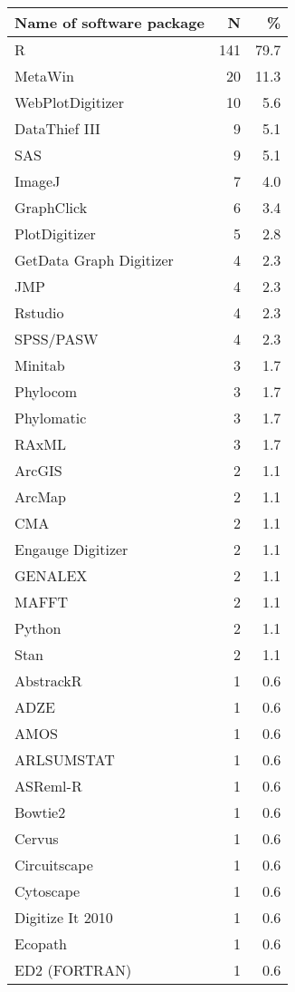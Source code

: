 \begin{table}[ht]
\centering
\begin{tabular}{lrr}
  \hline
Name of software package & N & \% \\ 
  \hline
R & 141 & 79.7 \\ 
  MetaWin & 20 & 11.3 \\ 
  WebPlotDigitizer & 10 & 5.6 \\ 
  DataThief III & 9 & 5.1 \\ 
  SAS & 9 & 5.1 \\ 
  ImageJ & 7 & 4.0 \\ 
  GraphClick & 6 & 3.4 \\ 
  PlotDigitizer & 5 & 2.8 \\ 
  GetData Graph Digitizer & 4 & 2.3 \\ 
  JMP & 4 & 2.3 \\ 
  Rstudio & 4 & 2.3 \\ 
  SPSS/PASW & 4 & 2.3 \\ 
  Minitab & 3 & 1.7 \\ 
  Phylocom & 3 & 1.7 \\ 
  Phylomatic & 3 & 1.7 \\ 
  RAxML & 3 & 1.7 \\ 
  ArcGIS & 2 & 1.1 \\ 
  ArcMap & 2 & 1.1 \\ 
  CMA & 2 & 1.1 \\ 
  Engauge Digitizer & 2 & 1.1 \\ 
  GENALEX & 2 & 1.1 \\ 
  MAFFT & 2 & 1.1 \\ 
  Python & 2 & 1.1 \\ 
  Stan & 2 & 1.1 \\ 
  AbstrackR & 1 & 0.6 \\ 
  ADZE & 1 & 0.6 \\ 
  AMOS & 1 & 0.6 \\ 
  ARLSUMSTAT & 1 & 0.6 \\ 
  ASReml-R & 1 & 0.6 \\ 
  Bowtie2 & 1 & 0.6 \\ 
  Cervus & 1 & 0.6 \\ 
  Circuitscape & 1 & 0.6 \\ 
  Cytoscape & 1 & 0.6 \\ 
  Digitize It 2010 & 1 & 0.6 \\ 
  Ecopath & 1 & 0.6 \\ 
  ED2 (FORTRAN) & 1 & 0.6 \\ 

\end{tabular}
\end{table}
